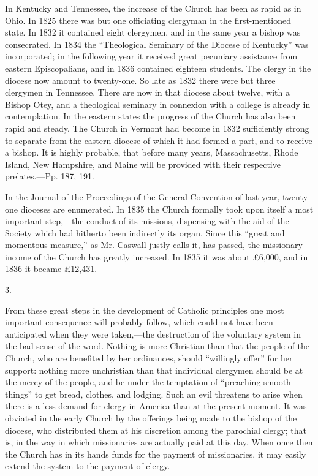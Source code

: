In Kentucky and Tennessee, the increase of the
Church has been as rapid as in Ohio. In 1825 there was but one
officiating clergyman in the first-mentioned state. In 1832 it
contained eight clergymen, and in the same year a bishop was
consecrated. In 1834 the ``Theological Seminary of the Diocese of
Kentucky'' was incorporated; in the following year it received great
pecuniary assistance from eastern Episcopalians, and in 1836 contained
eighteen students. The clergy in the diocese now amount to twenty-one.
So late as 1832 there were but three clergymen in Tennessee. There are
now in that diocese about twelve, with a Bishop Otey, and a
theological seminary in connexion with a college is already in
contemplation. In the eastern states the progress of the Church has
also been rapid and steady. The Church in Vermont had become in 1832
sufficiently strong to separate from the eastern diocese of which it
had formed a part, and to receive a bishop. It is highly probable,
that before many years, Massachusetts, Rhode Island, New Hampshire,
and Maine will be provided with their respective prelates.—Pp. 187,
191.

In the Journal of the Proceedings of the General
Convention of last year, twenty-one dioceses are enumerated. In 1835
the Church formally took upon itself a most important step,—the
conduct of its missions, dispensing with the aid of the Society which
had hitherto been indirectly its organ. Since this ``great and
momentous measure,'' as Mr. Caswall justly calls it, has passed, the
missionary income of the Church has greatly increased. In 1835 it was
about £6,000, and in 1836 it became £12,431.

3.

From these great steps in the development of
Catholic principles one most important consequence will probably
follow, which could not have been anticipated when they were
taken,—the destruction of the voluntary system in the bad sense of
the word. Nothing is more Christian than that the people of the
Church, who are benefited by her ordinances, should ``willingly offer''
for her support: nothing more unchristian than that individual
clergymen should be at the mercy of the people, and be under the
temptation of ``preaching smooth things'' to get bread, clothes, and
lodging. Such an evil threatens to arise when there is a less demand
for clergy in America than at the present moment. It was
obviated in the early Church by the offerings being made to the bishop
of the diocese, who distributed them at his discretion among the
parochial clergy; that is, in the way in which missionaries are
actually paid at this day. When once then the Church has in its hands
funds for the payment of missionaries, it may easily extend the system
to the payment of clergy.

